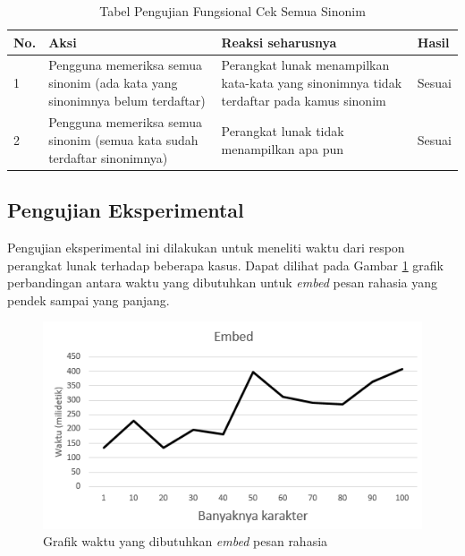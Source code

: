 \begin{table}[H]
\label{table-fungsional-cek-sinonim}
\centering
\caption{Tabel Pengujian Fungsional Cek Semua Sinonim}
\begin{tabular}{|p{0.3cm} | p{4.5cm} | p{7cm} | p{2.5cm} |}\hline
No. & Aksi & Reaksi seharusnya & Hasil \\
\hline
1 & Pengguna memeriksa semua sinonim (ada kata yang sinonimnya belum terdaftar) & Perangkat lunak menampilkan kata-kata yang sinonimnya tidak terdaftar pada kamus sinonim & Sesuai\\
2 & Pengguna memeriksa semua sinonim (semua kata sudah terdaftar sinonimnya) & Perangkat lunak tidak menampilkan apa pun & Sesuai \\
\hline
\end{tabular}
\end{table}

\subsection{Pengujian Eksperimental}
Pengujian eksperimental ini dilakukan untuk meneliti waktu dari respon perangkat lunak terhadap beberapa kasus. Dapat dilihat pada Gambar \ref{fig:graf-embed} grafik perbandingan antara waktu yang dibutuhkan untuk \textit{embed} pesan rahasia yang pendek sampai yang panjang.

\begin{figure}[H]
	\centering
	\includegraphics[scale=0.8]{Gambar/graf-embed}
	\caption{Grafik waktu yang dibutuhkan \textit{embed} pesan rahasia} 
	\label{fig:graf-embed}
\end{figure}

